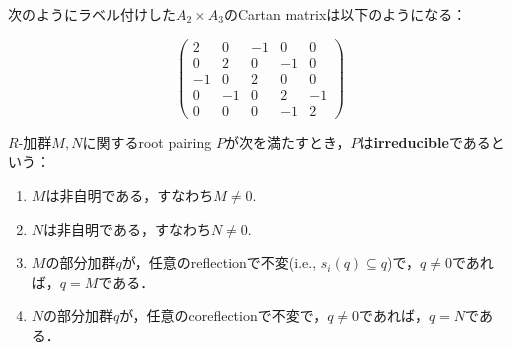 \begin{example}
  \label{ex:A2xA3}
  次のようにラベル付けした$A_2 \times A_3$のCartan matrixは以下のようになる：
  \begin{figure}[h]
  \centering
  \begin{minipage}{0.43\columnwidth}
    \centering
    \begin{equation}
    \begin{pmatrix}
      2 & 0 & -1 & 0 & 0\\
      0 & 2 & 0 & -1 & 0\\
      -1 & 0 & 2 & 0 & 0\\
      0 & -1 & 0 & 2 & -1\\
      0 & 0 & 0 & -1 & 2
    \end{pmatrix}
  \end{equation}
  \end{minipage}
  \begin{minipage}{0.43\columnwidth}
    \centering
  \end{minipage}
\end{figure}
\end{example}

\begin{definition}
  \label{defi:RootPairing.IsIrreducible}
  \leanok
  $R$-加群$M, N$に関するroot pairing $P$が次を満たすとき，$P$は\textbf{irreducible}であるという：
  \begin{enumerate}[label=(\roman*)]
    \item $M$は非自明である，すなわち$M \ne 0$.
    \item $N$は非自明である，すなわち$N \ne 0$.
    \item $M$の部分加群$q$が，任意のreflectionで不変(i.e., $s_i(q) \subseteq q$)で，$q \ne 0$であれば，$q = M$である．
    \item $N$の部分加群$q$が，任意のcoreflectionで不変で，$q \ne 0$であれば，$q = N$である．
  \end{enumerate}
\end{definition}

